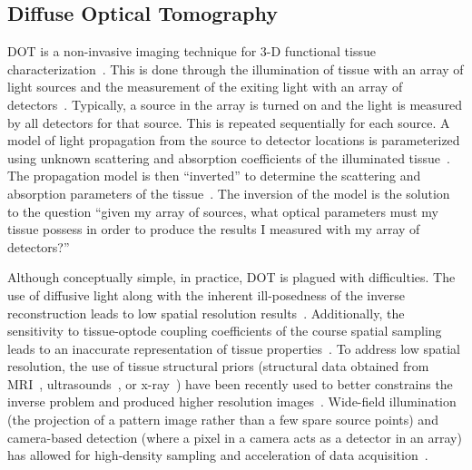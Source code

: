 \subsection{Diffuse Optical Tomography}
\ac{DOT} is a non-invasive imaging technique for 3-D functional tissue characterization~\cite{Boas2001}. This is done through the illumination of tissue with an array of light sources and the measurement of the exiting light with an array of detectors~\cite{Culver2001}. Typically, a source in the array is turned on and the light is measured by all detectors for that source. This is repeated sequentially for each source. A model of light propagation from the source to detector locations is parameterized using unknown scattering and absorption coefficients of the illuminated tissue~\cite{Arridge1999}. The propagation model is then ``inverted'' to determine the scattering and absorption parameters of the tissue~\cite{Arridge1999}. The inversion of the model is the solution to the question ``given my array of sources, what optical parameters must my tissue possess in order to produce the results I measured with my array of detectors?''

Although conceptually simple, in practice, \ac{DOT} is plagued with difficulties. The use of diffusive light along with the inherent ill-posedness of the inverse reconstruction leads to low spatial resolution results~\cite{Arridge2009, Durduran2010}. Additionally, the sensitivity to tissue-optode coupling coefficients of the course spatial sampling leads to an inaccurate representation of tissue properties~\cite{Schweiger2007}. To address low spatial resolution, the use of tissue structural priors (structural data obtained from MRI~\cite{Pearlman2012}, ultrasounds~\cite{Zhu2010}, or x-ray~\cite{Fang2011, Deng2015}) have been recently used to better constrains the inverse problem and produced higher resolution images~\cite{Pearlman2012}. Wide-field illumination (the projection of a pattern image rather than a few spare source points) and camera-based detection (where a pixel in a camera acts as a detector in an array) has allowed for high-density sampling and acceleration of data acquisition~\cite{Belanger2010}. 


